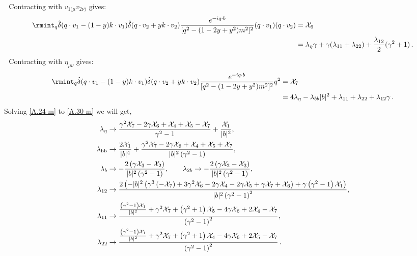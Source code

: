     \textbullet $\,\,$ Contracting with $v_{1(\mu}v_{2\nu)}$ gives:
    \begin{align}
        \begin{split}
             \rmint_q \hat\delta(q\cdot v_1-(1-y)k\cdot v_1)\hat\delta(q\cdot v_2+yk\cdot v_2)\frac{e^{-i q\cdot b}}{[q^2-(1-2y+y^2)m^2]^2}(q\cdot v_1)(q\cdot v_2)&=\mathcal{X}_6\\ &
              \hspace{0cm}=\lambda_{\eta}\gamma+\gamma(\lambda_{11}+\lambda_{22})+\frac{\lambda_{12}}{2}(\gamma^2+1)\,.
        \end{split}
    \end{align}
      \textbullet $\,\,$ Contracting with $\eta_{\mu\nu}$ gives:
      \begin{align}
          \begin{split}
                \rmint_q \hat\delta(q\cdot v_1-(1-y)k\cdot v_1)\hat\delta(q\cdot v_2+yk\cdot v_2)\frac{e^{-i q\cdot b}}{[q^2-(1-2y+y^2)m^2]^2}q^2&=\mathcal{X}_7\\ &
                \hspace{0cm}=4\lambda_\eta-\lambda_{bb}|b|^2+\lambda_{11}+\lambda_{22}+\lambda_{12}\gamma\,.\label{A.30 m}
          \end{split}
      \end{align}
Solving \eqref{A.24 m} to \eqref{A.30 m} we will get,
\begin{align}
\lambda _{\eta }
&\to \frac{\gamma ^2 \mathcal{X}_{7}-2 \gamma  \mathcal{X}_{6}+\mathcal{X}_{4}+\mathcal{X}_{5}-\mathcal{X}_{7}}{\gamma ^2-1}+\frac{\mathcal{X}_{1}}{|b|^2},\notag\\
\lambda _{\text{bb}}
&\to \frac{2 \mathcal{X}_{1}}{|b|^4}+\frac{\gamma ^2 \mathcal{X}_{7}-2 \gamma  \mathcal{X}_{6}+\mathcal{X}_{4}+\mathcal{X}_{5}+\mathcal{X}_{7}}{|b|^2 \left(\gamma ^2-1\right)},\notag\\
\lambda _b
&\to -\frac{2 \left(\gamma  \mathcal{X}_{3}-\mathcal{X}_{2}\right)}{|b|^2 \left(\gamma ^2-1\right)},\qquad
\lambda _{2 b}\to -\frac{2 \left(\gamma  \mathcal{X}_{2}-\mathcal{X}_{3}\right)}{|b|^2 \left(\gamma ^2-1\right)},\notag\\
\lambda _{12}
&\to \frac{2 \left(-|b|^2 \left(\gamma ^3 \left(-\mathcal{X}_{7}\right)+3 \gamma ^2 \mathcal{X}_{6}-2 \gamma  \mathcal{X}_{4}-2 \gamma  \mathcal{X}_{5}+\gamma  \mathcal{X}_{7}+\mathcal{X}_{6}\right)+\gamma  \left(\gamma ^2-1\right) \mathcal{X}_{1}\right)}{|b|^2 \left(\gamma ^2-1\right)^2},\notag\\
\lambda _{11}
&\to \frac{\frac{\left(\gamma ^2-1\right) \mathcal{X}_{1}}{|b|^2}+\gamma ^2 \mathcal{X}_{7}+\left(\gamma ^2+1\right) \mathcal{X}_{5}-4 \gamma  \mathcal{X}_{6}+2 \mathcal{X}_{4}-\mathcal{X}_{7}}{\left(\gamma ^2-1\right)^2},\notag\\
\lambda _{22}
&\to \frac{\frac{\left(\gamma ^2-1\right) \mathcal{X}_{1}}{|b|^2}+\gamma ^2 \mathcal{X}_{7}+\left(\gamma ^2+1\right) \mathcal{X}_{4}-4 \gamma  \mathcal{X}_{6}+2 \mathcal{X}_{5}-\mathcal{X}_{7}}{\left(\gamma ^2-1\right)^2}\,.
\end{align}
